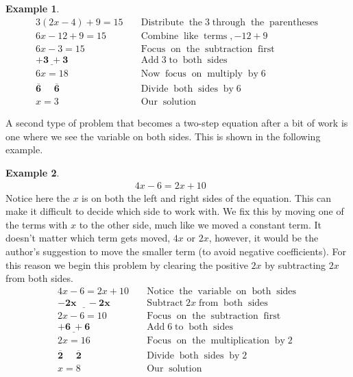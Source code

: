 \documentclass[12pt]{book}
\theoremstyle{definition}
\newtheorem{example}{Example}
\newcommand{\tmmathbf}[1]{\ensuremath{\boldsymbol{#1}}}
\newcommand{\tmop}[1]{\ensuremath{\operatorname{#1}}}
\begin{document}
\begin{example}\label{Lin20}
  \begin{eqnarray*}
    3 (2 x - 4) + 9 = 15 &  & \tmop{Distribute} \tmop{the} 3 \tmop{through}
    \tmop{the} \tmop{parentheses}\\
    6 x - 12 + 9 = 15 &  & \tmop{Combine} \tmop{like} \tmop{terms}, - 12 + 9\\
    6 x - 3 = 15 &  & \tmop{Focus} \tmop{on} \tmop{the} \tmop{subtraction}
    \tmop{first}\\
    \tmmathbf{\underline{+ 3 ~+ 3}} &  & \tmop{Add} 3 \tmop{to} \tmop{both} \tmop{sides}\\
    6 x = 18 &  & \tmop{Now} \tmop{focus} \tmop{on} \tmop{multiply} \tmop{by}
    6\\
    \tmmathbf{\overline{6} ~~~~~~ \overline{6}} &  & \tmop{Divide} \tmop{both} \tmop{sides}
    \tmop{by} 6\\
    x = 3 &  & \tmop{Our} \tmop{solution}
  \end{eqnarray*}
\end{example}
A second type of problem that becomes a two-step equation after a bit of work is one where we see the variable on both sides. This is shown in the following example.
\begin{example}\label{Lin21}
    \begin{eqnarray*}
    4 x - 6 = 2 x + 10 &  & 
  \end{eqnarray*}
Notice here the $x$ is on both the left and right sides of the   equation. This can make it difficult to decide which side to work with. We fix this by moving one of the terms with $x$ to the other side, much like we moved a constant term. It doesn't matter which term gets moved, $4x$ or $2x$, however, it would be the author's suggestion to move the smaller term (to avoid negative coefficients). For this reason we begin this problem by clearing the positive $2 x$ by subtracting $2 x$ from both sides.
  \begin{eqnarray*}
    4 x - 6 = 2 x + 10 &  & \tmop{Notice} \tmop{the} \tmop{variable} \tmop{on}
    \tmop{both} \tmop{sides}\\
    \tmmathbf{\underline{- 2 x ~~~~~- 2 x}}~~~~~~  &  & \tmop{Subtract} 2 x \tmop{from}
    \tmop{both} \tmop{sides}\\
    2 x - 6 = 10 &  & \tmop{Focus} \tmop{on} \tmop{the} \tmop{subtraction}
    \tmop{first}\\
    \tmmathbf{\underline{+ 6 ~+ 6}}  &  & \tmop{Add} 6 \tmop{to} \tmop{both}
    \tmop{sides}\\
    2 x = 16 &  & \tmop{Focus} \tmop{on} \tmop{the} \tmop{multiplication}
    \tmop{by} 2\\
    \tmmathbf{\overline{2} ~~~~~~ \overline{2} } &  & \tmop{Divide} \tmop{both}
    \tmop{sides} \tmop{by} 2\\
    x = 8 &  & \tmop{Our} \tmop{solution}
  \end{eqnarray*}
\end{example}
\end{document}
